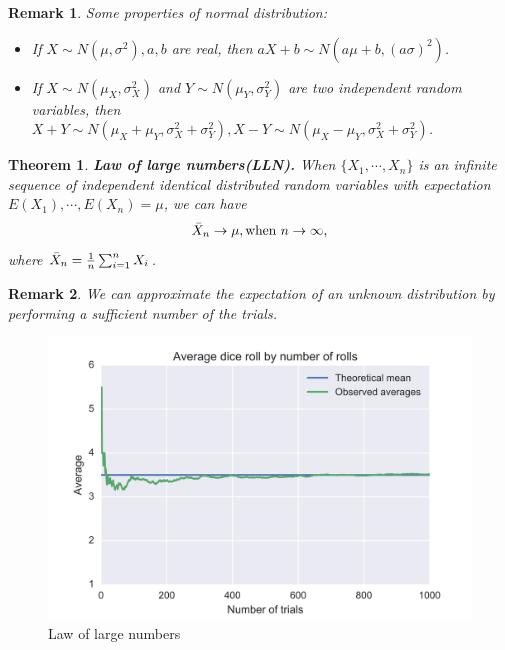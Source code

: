 \documentclass[a4paper]{article}
\theoremstyle{definition}
\theoremstyle{plain}
\newtheorem{theorem}{Theorem}
\newtheorem{remark}{Remark}
\begin{document}
\begin{remark}
Some properties of normal distribution:
\begin{itemize}
    \item If $X\sim N(\mu,\sigma^2), a, b$ are real, then $aX+b\sim N(a\mu+b,(a\sigma)^2)$.
    \item If $X\sim N(\mu_X,\sigma_X^2)$ and $Y\sim N(\mu_Y,\sigma_Y^2)$ are two independent random variables, then $ X+Y \sim N(\mu_X + \mu_Y, \sigma^2_X + \sigma^2_Y), {\displaystyle X-Y\sim N(\mu _{X}-\mu _{Y},\sigma _{X}^{2}+\sigma _{Y}^{2})}$.
\end{itemize}
\end{remark}

\begin{theorem}
\textbf{Law of large numbers(LLN).} When $\{X_1,\cdots,X_n\}$ is an infinite sequence of independent identical distributed random variables with expectation $E(X_1),\cdots,E(X_n)=\mu$, we can have
\begin{equation*}
    \Bar{X}_n\rightarrow\mu, \text{when }n\rightarrow\infty,
\end{equation*}
where $\Bar{X}_n=\frac{1}{n}\sum^n_{i=1} X_i$.
\end{theorem}

\begin{remark}
We can approximate the expectation of an unknown distribution by performing a sufficient number of the trials.
\end{remark}

\begin{figure}[H]
    \centering
    \includegraphics[scale=0.15]{figure/1920px-Lawoflargenumbers.svg.png}
    \caption{Law of large numbers}
\end{figure}
\end{document}
